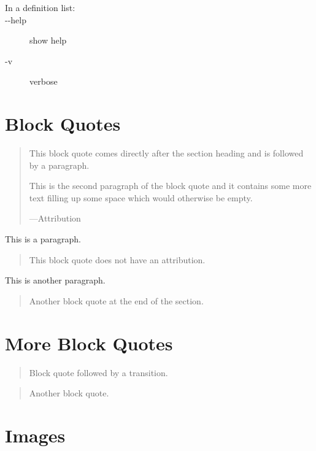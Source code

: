 \documentclass[a4paper]{article}
\providecommand*{\DUoptionlistlabel}[1]{\bfseries #1 \hfill}
\newenvironment{DUoptionlist}{%
    \list{}{\setlength{\labelwidth}{\DUoptionlistindent}
            \setlength{\rightmargin}{1cm}
            \setlength{\leftmargin}{\rightmargin}
            \addtolength{\leftmargin}{\labelwidth}
            \addtolength{\leftmargin}{\labelsep}
            \renewcommand{\makelabel}{\DUoptionlistlabel}}
  }
  {\endlist}
\providecommand*{\DUtransition}{%
  \hspace*{\fill}\hrulefill\hspace*{\fill}
  \vskip 0.5\baselineskip
}
\begin{document}
\begin{description}
\item[{In a definition list:}] \leavevmode
\begin{DUoptionlist}
\item[-{}-help]  show help
\item[-v]  verbose
\end{DUoptionlist}
\end{description}


\section{Block Quotes}

\begin{quote}
This block quote comes directly after the section heading and is
followed by a paragraph.

This is the second paragraph of the block quote and it contains
some more text filling up some space which would otherwise be
empty.
\nopagebreak

\raggedleft —Attribution
\end{quote}

This is a paragraph.

\begin{quote}
This block quote does not have an attribution.
\end{quote}

This is another paragraph.

\begin{quote}
Another block quote at the end of the section.
\end{quote}


\section{More Block Quotes}

\begin{quote}
Block quote followed by a transition.
\end{quote}

\DUtransition

\begin{quote}
Another block quote.
\end{quote}


\section{Images}
\end{document}
